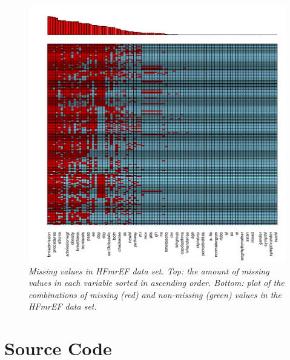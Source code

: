 \documentclass[../thesis.tex]{subfiles}
\begin{document}
\begin{figure}[h!]
    \centering
    \hspace*{-1cm}\includegraphics[width=1.1\textwidth]{doc/thesis/images/HFmrEF_miss_dist.pdf}
    \caption[Missing values in HFmrEF data set]{\textit{Missing values in HFmrEF data set. Top:  the amount of missing values in each variable sorted in ascending order. Bottom: plot of the combinations of missing (red) and non-missing (green) values in the HFmrEF data set.}}
    \label{fig:HFmrEF_missing}
\end{figure}

\newpage

\begin{figure}[!ht]
\begin{subfigure}{\textwidth}
\resizebox{\textwidth}{!}{\LARGE}
\end{subfigure}
\begin{subfigure}{\textwidth}
\resizebox{\textwidth}{!}{\LARGE}
\end{subfigure}
\end{figure}


\chapter{Source Code}
\label{chap:souce_code}
\end{document}
